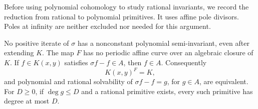 Before using polynomial cohomology to study rational invariants, we
record the reduction from rational to polynomial primitives.  It uses
affine pole divisors.  Poles at infinity are neither excluded nor needed
for this argument.

\begin{corollary}
\label{cor:rational-reduction}
No positive iterate of $\sigma$ has a nonconstant polynomial
semi-invariant, even after extending $K$.  The map $F$ has no periodic
affine curve over an algebraic closure of $K$.  If $f\in K(x,y)$
satisfies $\sigma f-f\in A$, then $f\in A$.  Consequently
\begin{equation}
  K(x,y)^F=K,
  \label{eq:rational-fixed-field}
\end{equation}
and polynomial and rational solvability of $\sigma f-f=g$, for
$g\in A$, are equivalent.  For $D\ge0$, if $\deg g\le D$ and a
rational primitive exists, every such primitive has degree at most $D$.
\end{corollary}

